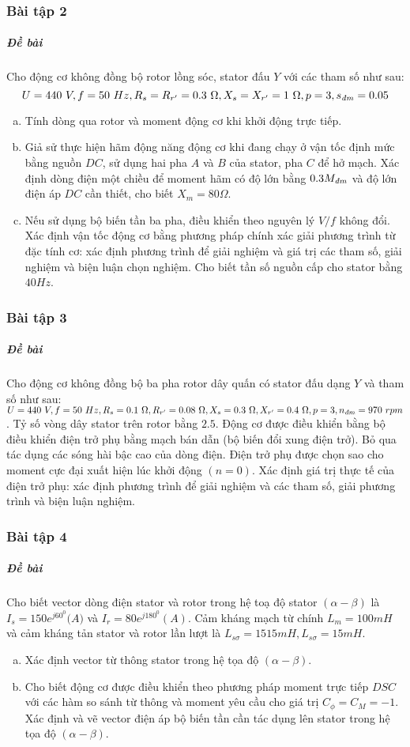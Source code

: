 \documentclass[12pt,a4paper]{article}
\begin{document}
\subsubsection{Bài tập 2}
\subparagraph{Đề bài} Cho động cơ không đồng bộ rotor lồng sóc, stator đấu $Y$ với các tham số như sau: $$ U = 440 \unit{V}, f = 50 \unit{Hz}, R_s = R_{r^ \prime}  = 0.3 \unit{\Omega}, X_s = X_{r^ \prime}  = 1 \unit{\Omega}, p = 3, \vitalic{s} = 0.05$$
\begin{enumerate}[a.]
\item Tính dòng qua rotor và moment động cơ khi khởi động trực tiếp.
\item Giả sử thực hiện hãm động năng động cơ khi đang chạy ở vận tốc định mức bằng nguồn $DC$, sử dụng hai pha $A$ và $B$ của stator, pha $C$ để hở mạch. Xác định dòng điện một chiều để moment hãm có độ lớn bằng $0.3 \vitalic{M}$ và độ lớn điện áp $DC$ cần thiết, cho biết $X_m = 80 \unit{\Omega}$.
\item Nếu sử dụng bộ biến tần ba pha, điều khiển theo nguyên lý $V/f$ không đổi. Xác định vận tốc động cơ bằng phương pháp chính xác giải phương trình từ đặc tính cơ: xác định phương trình để giải nghiệm và
giá trị các tham số, giải nghiệm và biện luận chọn nghiệm. Cho biết tần số nguồn cấp cho stator bằng $40 \unit{Hz}$.
\end{enumerate}
\subsubsection{Bài tập 3}
\subparagraph{Đề bài} Cho động cơ không đồng bộ ba pha rotor dây quấn có stator đấu dạng $Y$ và tham số như sau: $ U = 440 \unit{V}, f = 50 \unit{Hz}, R_s = 0.1 \unit{\Omega}, R_{r^ \prime}  = 0.08 \unit{\Omega}, X_s = 0.3 \unit{\Omega}, X_{r^ \prime}  = 0.4 \unit{\Omega}, p = 3, \vitalic{n} = 970 \unit{rpm}$. Tỷ số vòng dây stator trên rotor bằng $2.5$. Động cơ được điều khiển bằng bộ điều khiển điện trở phụ bằng mạch bán dẫn (bộ biến đổi xung điện trở). Bỏ qua tác dụng các sóng hài bậc cao của dòng điện. Điện trở phụ được chọn sao cho moment cực đại xuất hiện lúc khởi động $(n=0)$. Xác định giá trị thực tế của điện trở phụ: xác định phương trình để giải nghiệm và các
tham số, giải phương trình và biện luận nghiệm.
\subsubsection{Bài tập 4}
\subparagraph{Đề bài} Cho biết vector dòng điện stator và rotor trong hệ toạ độ stator $(\alpha - \beta)$ là $I_s = 150e^{j60^0} (\unit{A)}$ và $I_r = 80e^{j180^0} (\unit{A})$. Cảm kháng mạch từ chính $L_m = 100 \unit{mH}$ và cảm kháng tản stator và rotor lần lượt là $L_{s\sigma} = 15 \unit{15mH}, L_{s\sigma} = 15 \unit{mH}$.
\begin{enumerate}[a.]
\item Xác định vector từ thông stator trong hệ tọa độ $(\alpha - \beta)$.
\item Cho biết động cơ được điều khiển theo phương pháp moment trực tiếp $DSC$ với các hàm so sánh từ thông và moment yêu cầu cho giá trị $C_{\phi} = C_M = -1$. Xác định và vẽ vector điện áp bộ biến tần cần tác dụng lên stator trong hệ tọa độ $(\alpha - \beta)$.
\end{enumerate}
\end{document}

